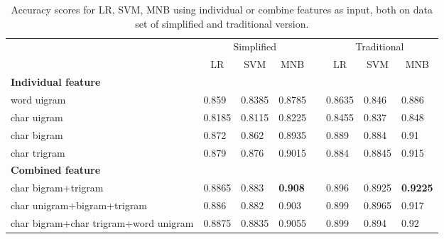 \documentclass[11pt,a4paper]{article}
\begin{document}
\begin{table}[]
\begin{tabular}{llllllll}
\hline
\multirow{2}{*}{}                     & \multicolumn{3}{c}{Simplified}                                             &  & \multicolumn{3}{c}{Traditional}                                            \\ \cline{2-4} \cline{6-8} 
                                      & \multicolumn{1}{c}{LR} & \multicolumn{1}{c}{SVM} & \multicolumn{1}{c}{MNB} &  & \multicolumn{1}{c}{LR} & \multicolumn{1}{c}{SVM} & \multicolumn{1}{c}{MNB} \\ \cline{1-4} \cline{6-8} 
\multicolumn{8}{l}{\textbf{Individual feature}}                                                                                                                                                    \\
word uigram                           & 0.859                  & 0.8385                  & 0.8785                  &  & 0.8635                 & 0.846                   & 0.886                   \\
char uigram                           & 0.8185                 & 0.8115                  & 0.8225                  &  & 0.8455                 & 0.837                   & 0.848                   \\
char bigram                           & 0.872                  & 0.862                   & 0.8935                  &  & 0.889                  & 0.884                   & 0.91                    \\
char trigram                          & 0.879                  & 0.876                   & 0.9015                  &  & 0.884                  & 0.8845                  & 0.915                   \\ \hline
\multicolumn{8}{l}{\textbf{Combined feature}}                                                                                                                                                      \\
char bigram+trigram                   & 0.8865                 & 0.883                   & \textbf{0.908}          &  & 0.896                  & 0.8925                  & \textbf{0.9225}         \\
char unigram+bigram+trigram           & 0.886                  & 0.882                   & 0.903                   &  & 0.899                  & 0.8965                  & 0.917                   \\
char bigram+char trigram+word unigram & 0.8875                 & 0.8835                  & 0.9055                  &  & 0.899                  & 0.894                   & 0.92                    \\ \hline
\end{tabular}
\caption{Accuracy scores for LR, SVM, MNB using individual or combine features as input, both on data set of simplified and traditional version.}
\label{combine_ngram_p}
\end{table}
\end{document}
